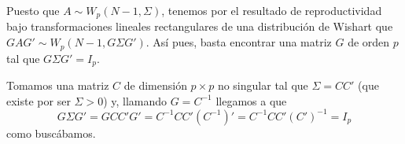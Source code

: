 \documentclass[11pt,a4paper]{article}
\begin{document}
\begin{enumerate}[label=\arabic*.]
\begin{enumerate}[label=(\alph*)]
Puesto que $A \sim W_{p}(N-1, \Sigma)$, tenemos por el resultado de reproductividad bajo transformaciones lineales rectangulares de una distribución de Wishart que $GAG' \sim W_{p}(N-1, G \Sigma G')$. Así pues, basta encontrar una matriz $G$ de orden $p$ tal que $G \Sigma G' = I_{p}$.

Tomamos una matriz $C$ de dimensión $p \times p$ no singular tal que $\Sigma = CC'$ (que existe por ser $\Sigma > 0$) y, llamando $G = C^{-1}$ llegamos a que
$$G \Sigma G' = G C C' G' = C^{-1} C C' (C^{-1})' = C^{-1} CC' (C')^{-1} = I_{p}$$
como buscábamos.

\end{enumerate}
\end{enumerate}
\end{document}
